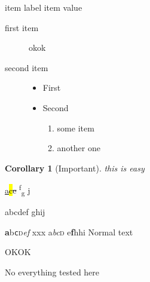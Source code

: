 \documentclass{book}
\begin{document}
\begin{list}{}{}
\item[item label] item value
\begin{description}
\item[first item] okok
\item[second item]
\begin{itemize}
\item First
\item Second
\begin{enumerate}
\item some item
\item another one
\end{enumerate}
\end{itemize}
\end{description}
\end{list}

\newtheorem{xCor}{Corollary}
\begin{xCor}[Important] this is easy \end{xCor}

\ul{a}\hl{c}\st{e}
\textsuperscript{f}\textsubscript{g}
\underline{j}

{\Huge a}{\huge b}{\LARGE c}{\Large d}{\large e}{\normalsize f}{\small
  g}{\footnotesize h}{\scriptsize i}{\tiny j}

\textbf{a}\textsf{b}\texttt{c}\textsc{d}\textsl{e}\textit{f}
\textup{x}\textmd{x}\textrm{x} %
{\upshape a}{\itshape b}{\slshape c}{\scshape d}
{\mdseries e}{\bfseries f}{\ttfamily h}{\sffamily h}{\rmfamily i}
Normal text

\par

\def\cite@prenote{cf}
\def\cite@@type{fx}
\cite[p 30]{toto}

OKOK 
\tracingall
{}

No everything tested here
\def\X{} \def\Y{}
\begin{participant} \X\Y \end{participant}
\end{document}

